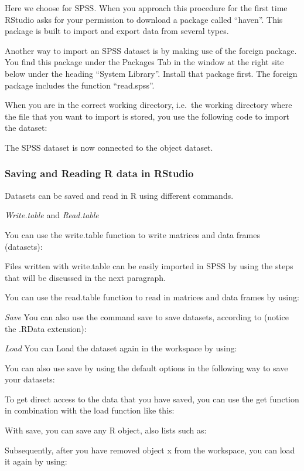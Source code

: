 \documentclass[]{book}
\theoremstyle{definition}
\theoremstyle{definition}
\theoremstyle{definition}
\theoremstyle{remark}
\begin{document}
Here we choose for SPSS. When you approach this procedure for the first
time RStudio asks for your permission to download a package called
``haven''. This package is built to import and export data from several
types.

Another way to import an SPSS dataset is by making use of the foreign
package. You find this package under the Packages Tab in the window at
the right site below under the heading ``System Library''. Install that
package first. The foreign package includes the function ``read.spss''.

When you are in the correct working directory, i.e.~the working
directory where the file that you want to import is stored, you use the
following code to import the dataset:

The SPSS dataset is now connected to the object dataset.

\subsubsection{Saving and Reading R data in
RStudio}\label{saving-and-reading-r-data-in-rstudio}

Datasets can be saved and read in R using different commands.

\emph{Write.table} and \emph{Read.table}

You can use the write.table function to write matrices and data frames
(datasets):

Files written with write.table can be easily imported in SPSS by using
the steps that will be discussed in the next paragraph.

You can use the read.table function to read in matrices and data frames
by using:

\emph{Save} You can also use the command save to save datasets,
according to (notice the .RData extension):

\emph{Load} You can Load the dataset again in the workspace by using:

You can also use save by using the default options in the following way
to save your datasets:

To get direct access to the data that you have saved, you can use the
get function in combination with the load function like this:

With save, you can save any R object, also lists such as:

Subsequently, after you have removed object x from the workspace, you
can load it again by using:
\end{document}
